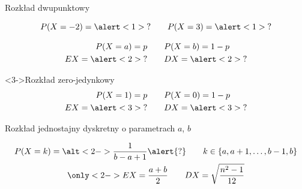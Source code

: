 \documentclass{mp}
\subtitle{Przykładowe rozkłady prawdopodobieństwa}
\begin{document}
\frame{\titlepage}

\begin{frame}{Rozkład dwupunktowy}
{
\begin{center}
\end{center}
\[ P(X=-2)=\alert<1>{?} \qquad P(X=3)=\alert<1>{?} \]
}
{
\begin{block}{}
\begin{align*}
P(X=a)=p & \qquad P(X=b)=1-p \\
EX=\alert<2>{?} & \qquad DX=\alert<2>{?}
\end{align*}
\end{block}
\begin{block}<3->{Rozkład zero-jedynkowy}
\begin{align*}
P(X=1)=p & \qquad P(X=0)=1-p \\
EX=\alert<3>{?} & \qquad DX=\alert<3>{?}
\end{align*}
\end{block}
}
\end{frame}

\begin{frame}{Rozkład jednostajny dyskretny o parametrach $a$, $b$}
\begin{center}
     
\end{center}
\begin{gather*}
P(X=k)=\alt<2->{\frac{1}{b-a+1}}{\alert{?}}\qquad k\in \{a,a+1,\ldots,b-1,b\} \\
\only<2->{EX=\frac{a+b}{2}\qquad DX=\sqrt{\frac{n^2-1}{12}}}
\end{gather*}
\end{frame}
\end{document}
